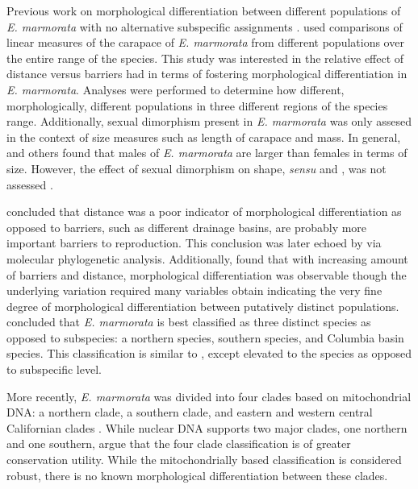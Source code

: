\documentclass[12pt,letterpaper]{article}\usepackage{graphicx, color}
\begin{document}
Previous work on morphological differentiation between different populations of \textit{E. marmorata} with no alternative subspecific assignments \citep{Seeliger1945,Holland1992}. 
%
\citet{Holland1992} used comparisons of linear measures of the carapace of \textit{E. marmorata} from different populations over the entire range of the species. This study was interested in the relative effect of distance versus barriers had in terms of fostering morphological differentiation in \textit{E. marmorata}. Analyses were performed to determine how different, morphologically, different populations in three different regions of the species range. Additionally, sexual dimorphism present in \textit{E. marmorata} was only assesed in the context of size measures such as length of carapace and mass. In general, \citet{Holland1992} and others \citep{Lubcke2007,Germano2008} found that males of \textit{E. marmorata} are larger than females in terms of size. However, the effect of sexual dimorphism on shape, \textit{sensu} \citet{Kendall1977a} and \citet{Dryden1998a}, was not assessed \citep{Holland1992,Lubcke2007,Germano2008}.

\citet{Holland1992} concluded that distance was a poor indicator of morphological differentiation as opposed to barriers, such as different drainage basins, are probably more important barriers to reproduction. This conclusion was later echoed by \citet{Spinks2005} via molecular phylogenetic analysis. Additionally, \citet{Holland1992} found that with increasing amount of barriers and distance, morphological differentiation was observable though the underlying variation required many variables obtain indicating the very fine degree of morphological differentiation between putatively distinct populations. \citet{Holland1992} concluded that \textit{E. marmorata} is best classified as three distinct species as opposed to subspecies: a northern species, southern species, and Columbia basin species. This classification is similar to \citet{Seeliger1945}, except elevated to the species as opposed to subspecific level.


More recently, \textit{E. marmorata} was divided into four clades based on mitochondrial DNA: a northern clade, a southern clade, and eastern and western central Californian clades \citep{Spinks2005,Spinks2010}. While nuclear DNA supports two major clades, one northern and one southern, \citet{Spinks2010} argue that the four clade classification is of greater conservation utility. 
While the mitochondrially based classification is considered robust, there is no known morphological differentiation between these clades.
\end{document}
